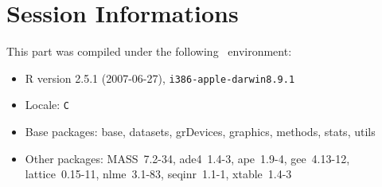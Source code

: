 \documentclass{article}
\begin{document}
\section{Session Informations}

This part was compiled under the following \Rlogo{}~environment:

\begin{itemize}
  \item R version 2.5.1 (2007-06-27), \verb|i386-apple-darwin8.9.1|
  \item Locale: \verb|C|
  \item Base packages: base, datasets, grDevices, graphics, methods,
    stats, utils
  \item Other packages: MASS~7.2-34, ade4~1.4-3, ape~1.9-4,
    gee~4.13-12, lattice~0.15-11, nlme~3.1-83, seqinr~1.1-1,
    xtable~1.4-3
\end{itemize}


\clearpage
{}


\end{document}
